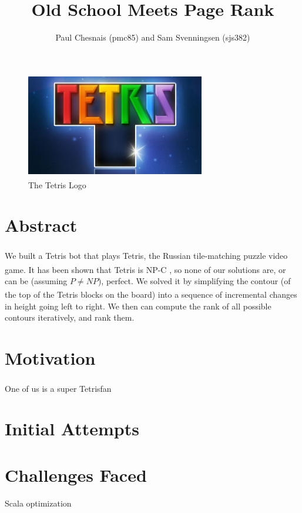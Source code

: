 \documentclass[ fontsize=11pt]{article}
\title{Old School \tetris{} Meets Page Rank}
\author{Paul Chesnais (pmc85) and Sam Svenningsen (sjs382)}
\date{}
\def\tetris{Tetris\textsuperscript{\textregistered}}
\begin{document}
\maketitle
\thispagestyle{empty}
\begin{figure}[H]
  \centering
  \includegraphics[height=125pt]{tetris}
  \caption{The \tetris{} Logo}
  \label{fig:the_tetris}
\end{figure}
\newpage
\section{Abstract}
\label{sec:abstract}

\par We built a \tetris{} bot that plays \tetris{}, the Russian tile-matching puzzle video game. It has been shown that \tetris{} is NP-C \cite{tetrishard}, so none of our solutions are, or can be (assuming $P \neq NP$), perfect.  We solved it by simplifying the contour (of the top of the \tetris{} blocks on the board) into a sequence of incremental changes in height going left to right. We then can compute the rank of all possible contours iteratively, and rank them.




\section{Motivation}
\label{sec:motivation}
One of us is a super \tetris{}fan


\section{Initial Attempts}
\label{sec:initial_attempts}

\section{Challenges Faced}
\label{sec:challenges_faced}

\par Scala optimization
\end{document}
